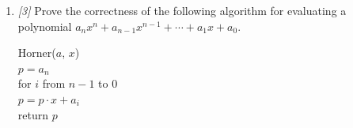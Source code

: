 \documentclass[10pt, letterpaper]{article}
\numberwithin{equation}{section}
\begin{document}
\begin{enumerate}
\begin{proof}
            We begin with the expression on the left, apply the inductive hypothesis, leverage the
            division theorem, and simplify to obtain the expression on the right.
            \begin{align}
                \label{mul:1}
                \textnormal{Multiply}(y, n) & =
                \textnormal{Multiply}(cy, \lfloor n/c \rfloor) + y \cdot (n \bmod c) \\
                \label{mul:2}
                & = cy \cdot \lfloor n/c \rfloor + y \cdot (n \bmod c) \\
                \label{mul:3}
                & = y(c \cdot \lfloor n/c \rfloor + n \bmod c) \\
                \label{mul:4}
                & = y(c \cdot \lfloor n/c \rfloor + n - c \cdot \lfloor n/c \rfloor) \\
                \label{mul:5}
                & = yn
            \end{align}

            where:

            \eqref{mul:1}: since $n \neq 0$ \\
            \eqref{mul:2}: since $c \geq 2$ and $\lfloor n/c \rfloor < n$, we can apply the
            inductive hypothesis \\
            \eqref{mul:3}: factor out $y$ \\
            \eqref{mul:4}: $n \bmod c$ can be expressed as $n - c \cdot \lfloor n/c \rfloor$, since
            $c \neq 0$ \\
            \eqref{mul:5}: simplify the equation

            \underline{Conclusion.} Therefore, by induction, the algorithm correctly multiplies two
            natural numbers $y$ and $z$ for all integer constants $c \geq 2$.
        \end{proof}

        \item \textit{[3]} Prove the correctness of the following algorithm for evaluating a
        polynomial $a_nx^n + a_{n - 1}x^{n - 1} + \cdots + a_1x + a_0$.
        \begin{flushleft}
            \hspace{2em} Horner($a$, $x$) \\
            \hspace{4em} $p = a_n$ \\
            \hspace{4em} for $i$ from $n - 1$ to $0$ \\
            \hspace{6em} $p = p \cdot x + a_i$ \\
            \hspace{4em} return $p$
        \end{flushleft}


\end{enumerate}
\end{document}
